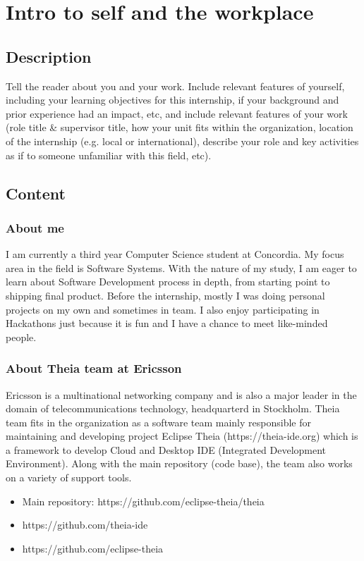 \newpage
\section{Intro to self and the workplace}

\subsection{Description}
Tell the reader about you and your work. Include relevant features of yourself, including your learning objectives for this internship, if your background and prior experience had an impact, etc, and include relevant features of your work (role title \& supervisor title, how your unit fits within the organization, location of the internship (e.g. local or international), describe your role and key activities as if to someone unfamiliar with this field, etc).

\subsection{Content}

\subsubsection{About me}
I am currently a third year Computer Science student at Concordia. 
My focus area in the field is Software Systems. 
With the nature of my study, I am eager to learn about Software Development process in depth, from starting point to shipping final product.
Before the internship, mostly I was doing personal projects on my own and sometimes in team.
I also enjoy participating in Hackathons just because it is fun and I have a chance to meet like-minded people.

\subsubsection{About Theia team at Ericsson}
Ericsson is a multinational networking company and is also a major leader in the domain of telecommunications technology, headquarterd in Stockholm.
Theia team fits in the organization as a software team mainly responsible for maintaining and developing project Eclipse Theia (https://theia-ide.org)
which is a framework to develop Cloud and Desktop IDE (Integrated Development Environment).
Along with the main repository (code base), the team also works on a variety of support tools.

\begin{itemize}
    \item Main repository: https://github.com/eclipse-theia/theia
    \item https://github.com/theia-ide 
    \item https://github.com/eclipse-theia
\end{itemize}


